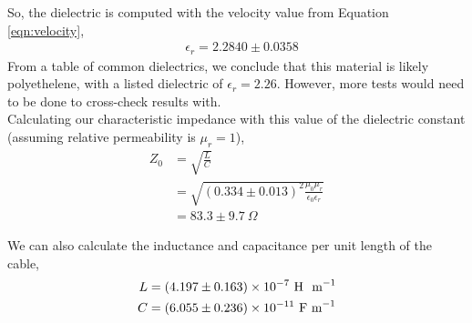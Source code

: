 So, the dielectric is computed with the velocity value from Equation \ref{eqn:velocity},
\begin{align}
    &\boxed{\epsilon_r = 2.2840 \pm 0.0358}
\end{align}
From a table of common dielectrics\cite{dielectric}, we conclude that this material is likely polyethelene, with a listed dielectric of $\epsilon_r = 2.26$. However, more tests would need to be done to cross-check results with.\\

Calculating our characteristic impedance with this value of the dielectric constant (assuming relative permeability is $\mu_r=1$),
\begin{align}
    Z_0 &= \sqrt{\frac{L}{C}} \\
    &= \sqrt{(0.334\pm0.013)^2\frac{\mu_0 \mu_r}{\epsilon_0 \epsilon_r}} \\
    &= 83.3 \pm 9.7 \ \Omega \label{eqn:characteristic_impedance}
\end{align}

We can also calculate the inductance and capacitance per unit length of the cable,
\begin{align}
    L &= (4.197 \pm 0.163)\times10^{-7} \ \text{H \ m}^{-1} \\
    C &= (6.055 \pm 0.236)\times10^{-11} \ \text{F\ m}^{-1}
\end{align}


\vspace{4mm}

